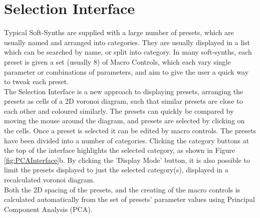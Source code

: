 \documentclass[11pt, oneside]{report}   	%
\begin{document}
\section{Selection Interface}
Typical Soft-Synths are supplied with a large number of presets, which are usually named and arranged into categories. They are usually displayed in a list which can be searched by name, or split into category. In many soft-synths, each preset is given a set (usually 8) of Macro Controls, which each vary single parameter or combinations of parameters, and aim to give the user a quick way to tweak each preset.\\
The Selection Interface is a new approach to displaying presets, arranging the presets as cells of a 2D voronoi diagram, such that similar presets are close to each other and coloured similarly. The presets can quickly be compared by moving the mouse around the diagram, and presets are selected by clicking on the cells. Once a preset is selected it can be edited by macro controls. 
The presets have been divided into a number of categories. Clicking the category buttons at the top of the interface highlights the selected category, as shown in Figure \ref{fig:PCAInterface}b. By clicking the 'Display Mode' button, it is also possible to limit the presets displayed to just the selected category(s), displayed in a recalculated voronoi diagram.\\
Both the 2D spacing of the presets, and the creating of the macro controls is calculated automatically from the set of presets' parameter values using Principal Component Analysis (PCA).
\end{document}
